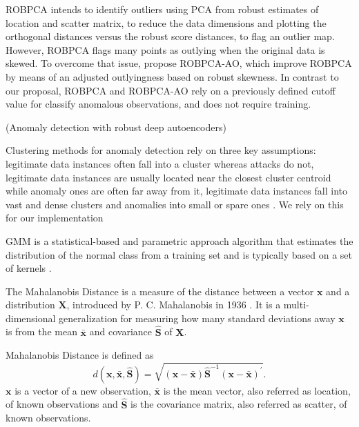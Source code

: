 \documentclass[review]{elsarticle}
\begin{document}
ROBPCA \cite{hubert2005robpca} intends to identify outliers using PCA from robust estimates of location and scatter matrix, to reduce the data dimensions and plotting the orthogonal distances versus the robust score distances, to flag an outlier map. However, ROBPCA flags many points as outlying when the original data is skewed. To overcome that issue, \cite{hubert2009robustskewed} propose ROBPCA-AO, which improve ROBPCA by means of an adjusted outlyingness based on robust skewness. In contrast to our proposal, ROBPCA and ROBPCA-AO rely on a previously defined cutoff value for classify anomalous observations, and does not require training.

\cite{zhou2017anomaly} (Anomaly detection with robust deep autoencoders)



Clustering methods for anomaly detection rely on three key assumptions: legitimate data instances often fall into a cluster whereas attacks do not, legitimate data instances are usually located near the closest cluster centroid while anomaly ones are often far away from it, legitimate data instances fall into vast and dense clusters and anomalies into small or spare ones \cite{ahmed2016survey, moustafa2019holistic}. We rely on this for our implementation

GMM is a statistical-based and parametric approach algorithm that estimates the distribution of the normal class from a training set and is typically based on a set of kernels \cite{moustafa2019holistic}.

The Mahalanobis Distance is a measure of the distance between a vector $\boldsymbol{x}$ and a distribution $\boldsymbol{X}$, introduced by P. C. Mahalanobis in 1936 \cite{mahalanobis1936md}. It is a multi-dimensional generalization for measuring how many standard deviations away $\boldsymbol{x}$ is from the mean $\boldsymbol{\bar{x}}$ and covariance $\boldsymbol{\hat{S}}$ of $\boldsymbol{X}$.

Mahalanobis Distance is defined as		
	\begin{equation}\label{eq:eq01}
		d(\boldsymbol{x},\bar{\boldsymbol{x}}, \boldsymbol{\hat{S}}) = \sqrt{(\boldsymbol{x} - \bar{\boldsymbol{x}}) \boldsymbol{\hat{S}}^{-1}(\boldsymbol{x} - \bar{\boldsymbol{x}})^\prime}.
	\end{equation}
$\boldsymbol{x}$ is a vector of a new observation, $\bar{\boldsymbol{x}}$ is the mean vector, also referred as location, of known observations and $\boldsymbol{\hat{S}}$ is the covariance matrix, also referred as scatter, of known observations.
\end{document}
